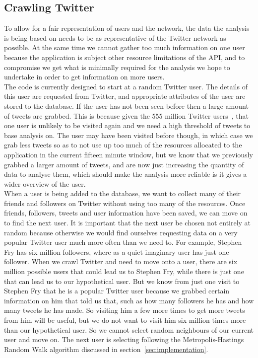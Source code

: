 \documentclass[a4paper]{article}
\begin{document}
\subsection{Crawling Twitter}
\label{subsec:designcrawlingtwitter}
To allow for a fair representation of users and the network, the data the analysis is being based on needs to be as representative of the Twitter network as possible. At the same time we cannot gather too much information on one user because the application is subject other resource limitations of the API, and to compromise we get what is minimally required for the analysis we hope to undertake in order to get information on more users.\\
The code is currently designed to start at a random Twitter user. The details of this user are requested from Twitter, and appropriate attributes of the user are stored to the database. If the user has not been seen before then a large amount of tweets are grabbed. This is because given the 555 million Twitter users~\cite{twitterstat}, that one user is unlikely to be visited again and we need a high threshold of tweets to base analysis on. The user may have been visited before though, in which case we grab less tweets so as to not use up too much of the resources allocated to the application in the current fifteen minute window, but we know that we previously grabbed a larger amount of tweets, and are now just increasing the quantity of data to analyse them, which should make the analysis more reliable is it gives a wider overview of the user.\\
When a user is being added to the database, we want to collect many of their friends and followers on Twitter without using too many of the resources. Once friends, followers, tweets and user information have been saved, we can move on to find the next user. It is important that the next user be chosen not entirely at random because otherwise we would find ourselves requesting data on a very popular Twitter user much more often than we need to. For example, Stephen Fry has six million followers, where as a quiet imaginary user has just one follower. When we crawl Twitter and need to move onto a user, there are six million possible users that could lead us to Stephen Fry, while there is just one that can lead us to our hypothetical user. But we know from just one visit to Stephen Fry that he is a popular Twitter user because we grabbed certain information on him that told us that, such as how many followers he has and how many tweets he has made. So visiting him a few more times to get more tweets from him will be useful, but we do not want to visit him six million times more than our hypothetical user. So we cannot select random neighbours of our current user and move on. The next user is selecting following the Metropolis-Hastings Random Walk algorithm discussed in section~\ref{sec:implementation}.
\end{document}
